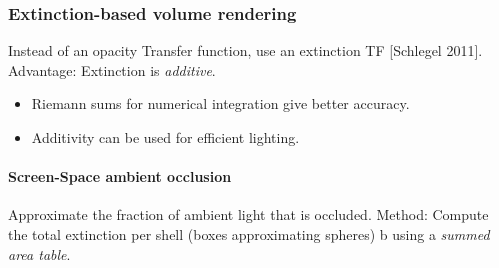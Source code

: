 \subsubsection{Extinction-based volume rendering}
Instead of an opacity Transfer function, use an extinction TF [Schlegel 2011]. Advantage: Extinction is \emph{additive}.
\begin{itemize}
    \item Riemann sums for numerical integration give better accuracy.
    \item Additivity can be used for efficient lighting.
\end{itemize}

\paragraph{Screen-Space ambient occlusion} Approximate the fraction of ambient light that is occluded. Method: Compute the total extinction per shell (boxes approximating spheres) b using a \emph{summed area table}.



